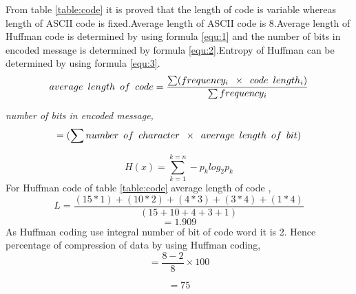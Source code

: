 \documentclass[conference]{IEEEtran}
\begin{document}
From table \ref{table:code} it is proved that the length of code is variable whereas length of ASCII code is fixed.Average length of ASCII code is 8.Average length of Huffman code is determined by using formula \ref{equ:1}\textsc{\cite{cormen2009introduction}} and the number of bits in encoded message is determined by formula \ref{equ:2}\cite{cormen2009introduction}.Entropy of Huffman can be determined by using formula \ref{equ:3}.\textsc{\cite{howard1994arithmetic}}
\begin{equation}
\label{equ:1}
    average\hspace{.5em} length\hspace{.5em} of\hspace{.5em} code  = \frac{\sum (frequency_i \hspace{.5em} \times \hspace{.5em} code\hspace{.5em} length_i)}{\sum frequency_i}
\end{equation}

\textit{number of bits in encoded message,}
\begin{equation}
\label{equ:2}
    =(\sum number\hspace{.5em}of\hspace{.5em}character\hspace{.5em} \times \hspace{.5em} average\hspace{.5em}length\hspace{.5em}of\hspace{.5em}bit)
\end{equation}

\begin{equation}
\label{equ:3}
    H(x)=\sum_{k=1}^{k=n}-p_k log_2p_k
\end{equation}
For Huffman code of table \ref{table:code} average length of code ,\\

 $$ L = \frac{(15*1)+(10*2)+(4*3)+(3*4)+
(1*4)}{(15+10+4+3+1)}$$
$$=1.909 $$
As Huffman coding use integral number of bit of code word it is 2.\cite{nelson1995data}
Hence percentage of compression of data by using Huffman coding, $$=\frac{8-2}{8}\times100$$

$$=75$$
\end{document}
